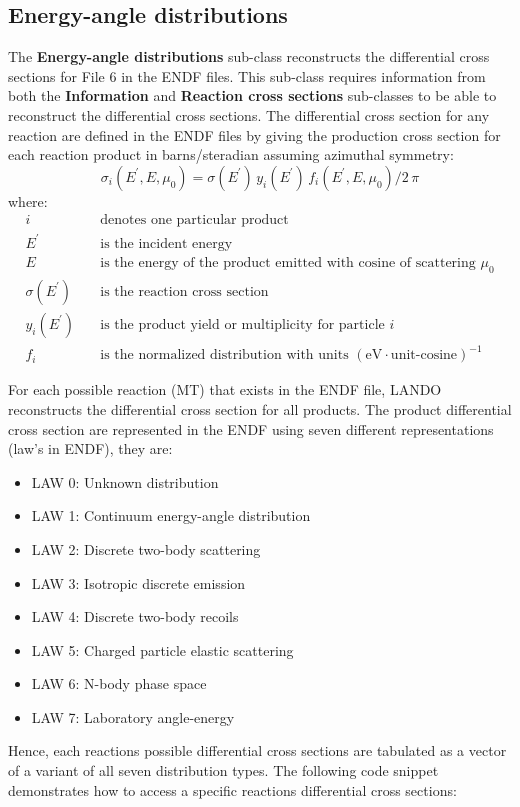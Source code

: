 \documentclass[../main.tex]{subfiles}
\begin{document}
\subsection{Energy-angle distributions}
The \textbf{Energy-angle distributions} sub-class reconstructs the differential cross sections for File 6 in the ENDF files. This sub-class requires information from both the \textbf{Information} and \textbf{Reaction cross sections} sub-classes to be able to reconstruct the differential cross sections. The differential cross section for any reaction are defined in the ENDF files by giving the production cross section for each reaction product in barns/steradian assuming azimuthal symmetry:
\begin{equation} \label{eqn:differential-cross-section}
    \sigma_i(E^{\prime},E,\mu_0) = \sigma(E^{\prime}) \, y_i(E^{\prime}) \, f_i(E^{\prime},E,\mu_0) / 2\, \pi
\end{equation}
where:
\begin{align*}
    i \quad & \text{denotes one particular product} \\
    E^{\prime} \quad & \text{is the incident energy} \\
    E \quad & \text{is the energy of the product emitted with cosine of scattering $\mu_0$} \\
    \sigma(E^{\prime}) \quad & \text{is the reaction cross section} \\
    y_i(E^{\prime}) \quad & \text{is the product yield or multiplicity for particle $i$} \\
    f_i \quad & \text{is the normalized distribution with units $(\text{eV}\cdot \text{unit-cosine})^{-1}$ }
\end{align*}

For each possible reaction (MT) that exists in the ENDF file, LANDO reconstructs the differential cross section for all products. The product differential cross section are represented in the ENDF using seven different representations (law's in ENDF), they are:
\begin{itemize}
    \item LAW 0: Unknown distribution
    \item LAW 1: Continuum energy-angle distribution
    \item LAW 2: Discrete two-body scattering
    \item LAW 3: Isotropic discrete emission
    \item LAW 4: Discrete two-body recoils
    \item LAW 5: Charged particle elastic scattering
    \item LAW 6: N-body phase space
    \item LAW 7: Laboratory angle-energy
\end{itemize}
Hence, each reactions possible differential cross sections are tabulated as a vector of a variant of all seven distribution types. The following code snippet demonstrates how to access a specific reactions differential cross sections:
\end{document}
